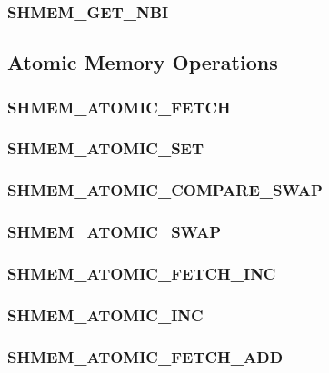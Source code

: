 \documentclass[10pt]{book}
\begin{document}
\subsubsection{\textbf{SHMEM\_GET\_NBI}}\label{subsec:shmem_get_nbi}



\subsection{Atomic Memory Operations}\label{sec:amo}


\subsubsection{\textbf{SHMEM\_ATOMIC\_FETCH}}
\label{subsec:shmem_atomic_fetch}


\subsubsection{\textbf{SHMEM\_ATOMIC\_SET}}
\label{subsec:shmem_atomic_set}


\subsubsection{\textbf{SHMEM\_ATOMIC\_COMPARE\_SWAP}}
\label{subsec:shmem_atomic_compare_swap}


\subsubsection{\textbf{SHMEM\_ATOMIC\_SWAP}}
\label{subsec:shmem_atomic_swap}


\subsubsection{\textbf{SHMEM\_ATOMIC\_FETCH\_INC}}
\label{subsec:shmem_atomic_fetch_inc}


\subsubsection{\textbf{SHMEM\_ATOMIC\_INC}}
\label{subsec:shmem_atomic_inc}


\subsubsection{\textbf{SHMEM\_ATOMIC\_FETCH\_ADD}}
\label{subsec:shmem_atomic_fetch_add}

\end{document}

